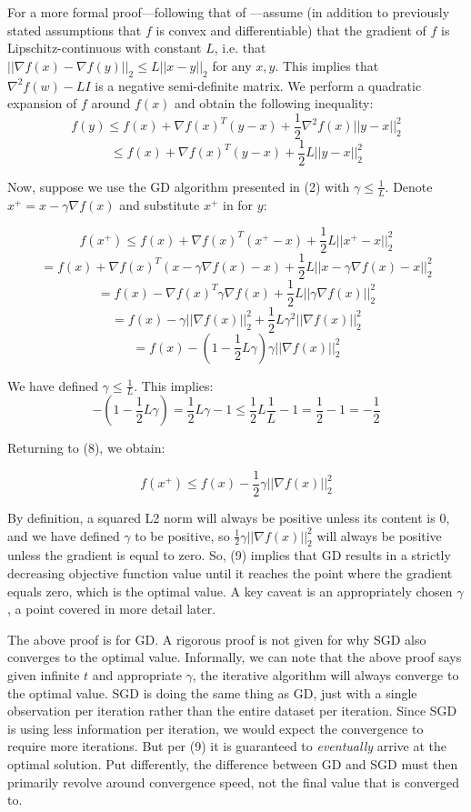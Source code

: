 \documentclass{article}
\begin{document}
For a more formal proof---following that of \cite{tibs_notes}---assume (in addition to previously stated assumptions
that $f$ is convex and differentiable) that the gradient of $f$ is Lipschitz-continuous
with constant $L$, i.e. that $||\nabla f(x) - \nabla f(y)||_2 \leq L||x-y||_2$
for any $x, y$. This implies that $\nabla^2 f(w) - LI$ is a negative
semi-definite matrix. We perform a quadratic expansion of $f$ around $f(x)$ and
obtain the following inequality:
$$
f(y) \leq f(x) + \nabla f(x)^T(y-x) + \frac{1}{2}\nabla^2 f(x)||y-x||_2^2
$$
\begin{equation}
	\leq f(x) + \nabla f(x)^T(y-x) + \frac{1}{2}L||y-x||_2^2
\end{equation}

Now, suppose we use the GD algorithm presented in (2) with $\gamma \leq
\frac{1}{L}$. Denote $x^+ = x - \gamma \nabla
f(x)$ and substitute $x^+$ in for $y$:

$$ f(x^+) \leq f(x) + \nabla f(x)^T(x^+ - x) + \frac{1}{2}L||x^+ - x||_2^2 $$
$$ = f(x) + \nabla f(x)^T(x - \gamma \nabla f(x) - x) + \frac{1}{2}L||x - \gamma \nabla f(x) - x||_2^2 $$
$$ = f(x) - \nabla f(x)^T \gamma \nabla f(x)  + \frac{1}{2}L||\gamma \nabla f(x)||_2^2 $$
$$ = f(x) - \gamma||\nabla f(x)||_2^2 + \frac{1}{2} L \gamma^2||\nabla f(x)||_2^2$$
\begin{equation}
= f(x) - (1 - \frac{1}{2}L\gamma)\gamma||\nabla f(x)||_2^2 
\end{equation}

We have defined $\gamma \leq \frac{1}{L}$. This implies:
$$
-(1 - \frac{1}{2}L \gamma) = \frac{1}{2}L \gamma - 1
\leq \frac{1}{2}L\frac{1}{L} - 1
= \frac{1}{2} - 1
= - \frac{1}{2}
$$

Returning to (8), we obtain:

\begin{equation}
f(x^+) \leq f(x) - \frac{1}{2}\gamma||\nabla f(x)||_2^2
\end{equation}

By definition, a squared L2 norm will always be positive unless its content is
0, and we have defined $\gamma$ to be positive, so $\frac{1}{2} \gamma||\nabla f(x)||_2^2$ will always be positive unless the
gradient is equal to zero. So, (9) implies that GD results in a strictly
decreasing objective function value until it reaches the point where the
gradient equals zero, which is the optimal value. A key caveat is an
appropriately chosen $\gamma$, a point covered in more detail later.

The above proof is for GD. A rigorous proof is not given for why SGD also
converges to the optimal value. Informally, we can note that the above proof
says given infinite $t$ and appropriate $\gamma$, the iterative algorithm will
always converge to the optimal value. SGD is doing the same thing as GD, 
just with a single observation per iteration 
rather than the entire dataset per iteration. Since SGD is using less information
per iteration, we would expect the convergence to require more iterations. But
per (9) it is guaranteed to \textit{eventually} arrive at the optimal solution.
Put differently, the difference between GD and SGD must then primarily revolve
around convergence speed, not the final value that is converged to.
\end{document}
